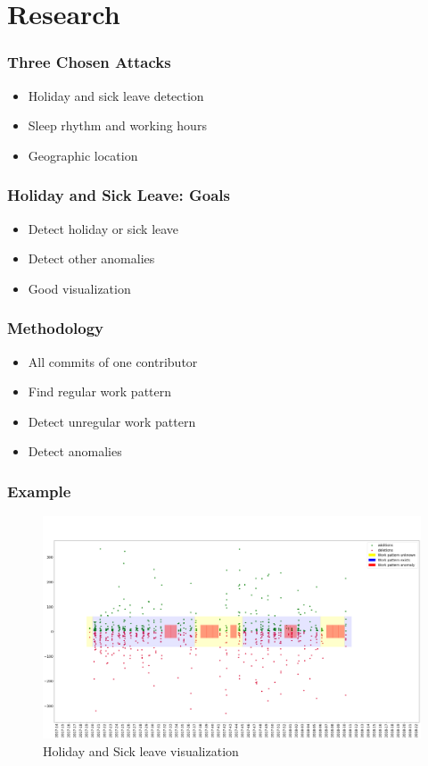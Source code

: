 \documentclass[t]{beamer}
\begin{document}
\section{Research}
\begin{frame}
    \frametitle{Three Chosen Attacks}
    \vspace{1cm}
    \begin{itemize}
        \item Holiday and sick leave detection
        \pause{}
        \item Sleep rhythm and working hours
        \pause{}
        \item Geographic location
    \end{itemize}
\end{frame}

\begin{frame}
    \frametitle{Holiday and Sick Leave: Goals}
    \vspace{1cm}
    \begin{itemize}
        \item Detect holiday or sick leave
        \pause{}
        \item Detect other anomalies
        \pause{}
        \item Good visualization
    \end{itemize}
\end{frame}

\begin{frame}
    \frametitle{Methodology}
    \vspace{1cm}
    \begin{itemize}
        \item All commits of one contributor
        \item Find regular work pattern
        \item Detect unregular work pattern
        \item Detect anomalies
    \end{itemize}
\end{frame}

\begin{frame}
    \frametitle{Example}
    \begin{figure}[H]
        \includegraphics[scale=0.115]{analysis/work-time-analysis}
        \centering
        \caption{Holiday and Sick leave visualization}
    \end{figure}
\end{frame}
\end{document}
